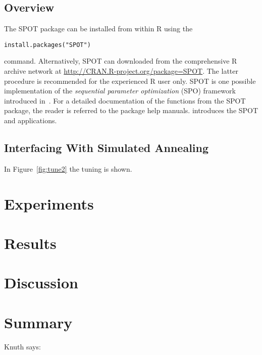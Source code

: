 \documentclass[runningheads]{llncs}
\begin{document}
\subsection{Overview}
 The SPOT package can be installed from within R using the 
\begin{verbatim}
install.packages("SPOT")
\end{verbatim}
command. Alternatively, SPOT can 
downloaded from the
comprehensive R  archive network at \url{http://CRAN.R-project.org/package=SPOT}.
The latter procedure is recommended for the experienced R user only. 
SPOT is one possible implementation of the \emph{sequential parameter optimization}\/
(SPO) framework introduced in~\cite{Bart06a}.
For a detailed documentation of the functions from the SPOT package, the
reader is referred to the package help manuals.
\cite{Bart12i} introduces the SPOT and applications.
\subsection{Interfacing With Simulated Annealing}
In Figure~\ref{fig:tune2} the tuning is shown.



\section{Experiments}

\section{Results}

\section{Discussion}

\section{Summary}
Knuth says:
\cite{knuth2005art}



\end{document}
